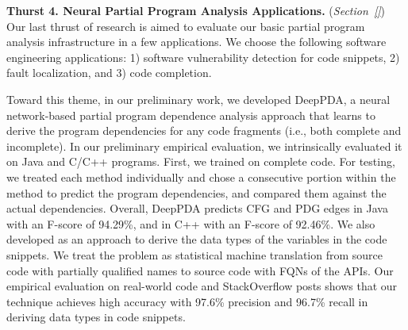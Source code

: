 \vspace{3pt}
\noindent \textbf{Thurst 4. Neural Partial Program Analysis
  Applications.}  ({\em Section~\ref{}}) Our last thrust of research
is aimed to evaluate our basic partial program analysis infrastructure
in a few applications. We choose the following software engineering
applications: 1) software vulnerability detection for code snippets,
2) fault localization, and 3) code completion.





Toward this theme, in our preliminary work, we developed DeepPDA, a
neural network-based partial program dependence analysis approach that
learns to derive the program dependencies for any code fragments
(i.e., both complete and incomplete). In our preliminary empirical
evaluation, we intrinsically evaluated it on Java and C/C++
programs. First, we trained {\tool} on complete code. For testing, we
treated each method individually and chose a consecutive portion
within the method to predict the program dependencies, and compared
them against the actual dependencies. Overall, DeepPDA predicts CFG
and PDG edges in Java with an F-score of 94.29\%, and in C++ with an
F-score of 92.46\%. We also developed as an approach to derive the
data types of the variables in the code snippets. We treat the problem
as statistical machine translation from source code with partially
qualified names to source code with FQNs of the APIs. Our empirical
evaluation on real-world code and StackOverflow posts shows that our
technique achieves high accuracy with 97.6\% precision and 96.7\%
recall in deriving data types in code snippets.
